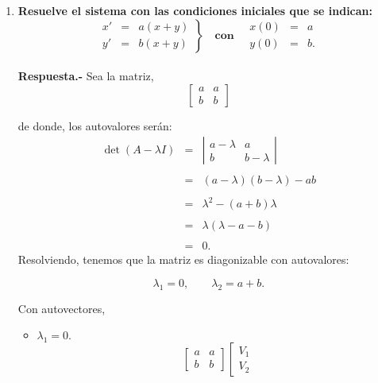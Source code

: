 \begin{enumerate}
    \item \textbf{\boldmath Resuelve el sistema con las condiciones iniciales que se indican:
    $$
    \left.
	\begin{array}{rcl}
	    x'&=&a(x+y)\\
	    y'&=&b(x+y)
	\end{array}
    \right\} \quad\textbf{con}\quad
    \begin{array}{rcl}
	x(0)&=&a\\
	y(0)&=&b.
    \end{array}
$$}
    \vspace{0.4cm}\\
	\textbf{Respuesta.-}\; Sea la matriz,
	$$
	\left[
	    \begin{array}{rr}
		a&a\\
		b&b
	    \end{array}
	\right]
	$$
    \begin{multicols}{2}
	de donde, los autovalores serán:
	$$
	\begin{array}{rcl}
	    \det(A-\lambda I) &=&
	    \left|
		\begin{array}{cc}
		    a-\lambda & a\\
		    b & b-\lambda
		\end{array}
	    \right|\\\\
			      &=& (a-\lambda)(b-\lambda)-ab\\\\
			      &=& \lambda^2-(a+b)\lambda\\\\
			      &=& \lambda(\lambda-a-b)\\\\
			      &=&0.
	\end{array}
	$$
	Resolviendo, tenemos que la matriz es diagonizable con autovalores:
	\begin{tcolorbox}
	    $$\lambda_1=0,\qquad \lambda_2=a+b.$$
	\end{tcolorbox}
	Con autovectores,
	\begin{itemize}
	    \item $\lambda_1=0.$
		$$
		\left[
		    \begin{array}{cc}
			a& a\\
			b& b 
		    \end{array}
		\right]
		\left[
		    \begin{array}{c}
			V_1\\
			V_2
		    \end{array}
$$
\end{itemize}
\end{multicols}
\end{enumerate}
